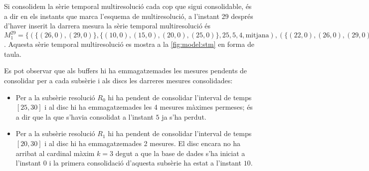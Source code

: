 \begin{example} 
Si consolidem la sèrie temporal multiresolució cada cop que sigui
consolidable, és a dir en els instants que marca l'esquema de
multiresolució, a l'instant 29 després d'haver inserit la darrera
mesura la sèrie temporal multiresolució és $M_1^{29} = \{ (
\{(26,0),(29,0)\},\{(10,0),(15,0),(20,0),(25,0)\}, 25 , 5 ,4 ,
\text{mitjana} ), ( \{(22,0),(26,0),(29,0)\}, \{(10,0),(20,0)\},
20 , 10 ,3 , \text{mitjana} ) \}$.  Aquesta sèrie temporal
multiresolució es mostra a la \autoref{fig:model:stm} en forma de
taula.


Es pot observar que als buffers hi ha emmagatzemades les mesures
pendents de consolidar per a cada subsèrie i als discs les darreres
mesures consolidades:
\begin{itemize}
\item Per a la subsèrie resolució $R_0$ hi ha pendent de consolidar
  l'interval de temps $[25,30]$ i al disc hi ha emmagatzemades les 4
  mesures màximes permeses; és a dir que la que s'havia consolidat a
  l'instant $5$ ja s'ha perdut.
\item Per a la subsèrie resolució $R_1$ hi ha pendent de consolidar
  l'interval de temps $[20,30]$ i al disc hi ha emmagatzemades 2
  mesures. El disc encara no ha arribat al cardinal màxim $k=3$ degut
  a que la base de dades s'ha iniciat a l'instant $0$ i la primera
  consolidació d'aquesta subsèrie ha estat a l'instant $10$.
\end{itemize}





\end{example}
